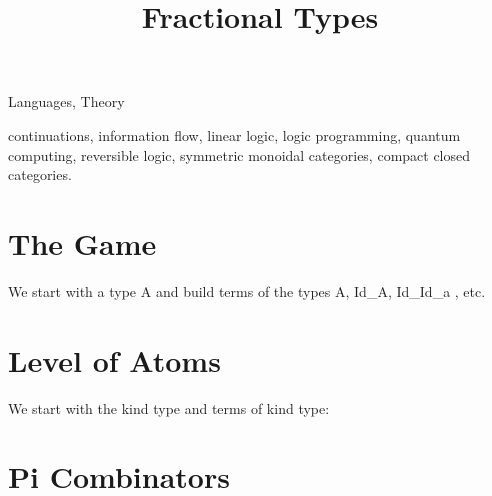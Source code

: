 \documentclass[preprint]{sigplanconf}
\begin{document}
\CopyrightYear{}
\copyrightdata{}
\titlebanner{}
\preprintfooter{}

\title{Fractional Types} 

\authorinfo{*}{*}{*}
\maketitle

\begin{abstract}

\end{abstract}


\terms
Languages, Theory

\keywords continuations, information flow, linear logic, logic programming,
quantum computing, reversible logic, symmetric monoidal categories, compact
closed categories.

\section{The Game}

We start with a type {{A}} and build terms of the types {{A}}, {{Id_A}},
{{Id_{Id_a} }}, etc.

\section{Level of Atoms}

We start with the kind {{type}} and terms of kind {{type}}:


%
%
%

\section{ {{Pi}} Combinators}
\end{document}

